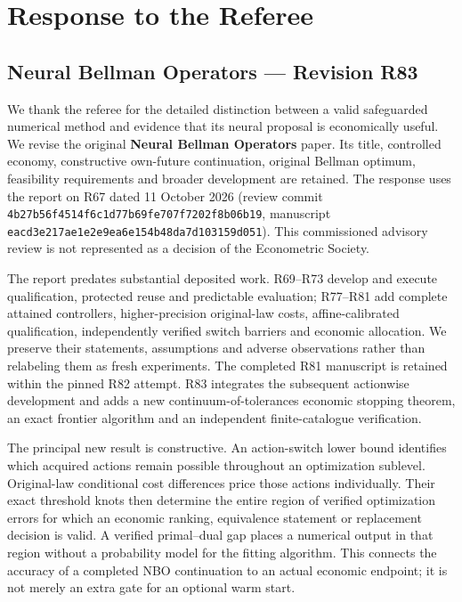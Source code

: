 \hypertarget{response-to-the-referee}{%
\section{Response to the Referee}\label{response-to-the-referee}}

\hypertarget{neural-bellman-operators-revision-r83}{%
\subsection{Neural Bellman Operators --- Revision
R83}\label{neural-bellman-operators-revision-r83}}

We thank the referee for the detailed distinction between a valid
safeguarded numerical method and evidence that its neural proposal is
economically useful. We revise the original \textbf{Neural Bellman
Operators} paper. Its title, controlled economy, constructive own-future
continuation, original Bellman optimum, feasibility requirements and
broader development are retained. The response uses the report on R67
dated 11 October 2026 (review commit
\texttt{4b27b56f4514f6c1d77b69fe707f7202f8b06b19}, manuscript
\texttt{eacd3e217ae1e2e9ea6e154b48da7d103159d051}). This commissioned
advisory review is not represented as a decision of the Econometric
Society.

The report predates substantial deposited work. R69--R73 develop and
execute qualification, protected reuse and predictable evaluation;
R77--R81 add complete attained controllers, higher-precision
original-law costs, affine-calibrated qualification, independently
verified switch barriers and economic allocation. We preserve their
statements, assumptions and adverse observations rather than relabeling
them as fresh experiments. The completed R81 manuscript is retained
within the pinned R82 attempt. R83 integrates the subsequent actionwise
development and adds a new continuum-of-tolerances economic stopping
theorem, an exact frontier algorithm and an independent finite-catalogue
verification.

The principal new result is constructive. An action-switch lower bound
identifies which acquired actions remain possible throughout an
optimization sublevel. Original-law conditional cost differences price
those actions individually. Their exact threshold knots then determine
the entire region of verified optimization errors for which an economic
ranking, equivalence statement or replacement decision is valid. A
verified primal--dual gap places a numerical output in that region
without a probability model for the fitting algorithm. This connects the
accuracy of a completed NBO continuation to an actual economic endpoint;
it is not merely an extra gate for an optional warm start.


